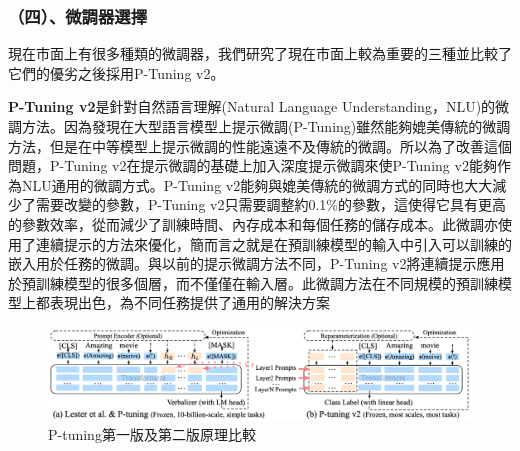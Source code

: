 \documentclass[12pt,a4paper,MingLiU,UTF8,natbib]{article}
\begin{document}
	\subsubsection{（四）、微調器選擇}
	現在市面上有很多種類的微調器，我們研究了現在市面上較為重要的三種並比較了它們的優劣之後採用P-Tuning v2。
	

	\textbf{P-Tuning v2}是針對自然語言理解(Natural Language Understanding，NLU)的微調方法。因為發現在大型語言模型上提示微調(P-Tuning)雖然能夠媲美傳統的微調方法，但是在中等模型上提示微調的性能遠遠不及傳統的微調。所以為了改善這個問題，P-Tuning v2在提示微調的基礎上加入深度提示微調來使P-Tuning v2能夠作為NLU通用的微調方式。P-Tuning v2能夠與媲美傳統的微調方式的同時也大大減少了需要改變的參數，P-Tuning v2只需要調整約0.1\%的參數，這使得它具有更高的參數效率，從而減少了訓練時間、內存成本和每個任務的儲存成本。\cite{liu2022ptuning}此微調亦使用了連續提示的方法來優化，簡而言之就是在預訓練模型的輸入中引入可以訓練的嵌入用於任務的微調。與以前的提示微調方法不同，P-Tuning v2將連續提示應用於預訓練模型的很多個層，而不僅僅在輸入層。此微調方法在不同規模的預訓練模型上都表現出色，為不同任務提供了通用的解決方案\cite{houlsby2019parameterefficient}

	
	\begin{figure}[H]
		\centering
	\includegraphics[width=\textwidth]{community_8263c05}
		\caption{P-tuning第一版及第二版原理比較\protect\cite{liu2022ptuning}}	
	\end{figure}
\end{document}
